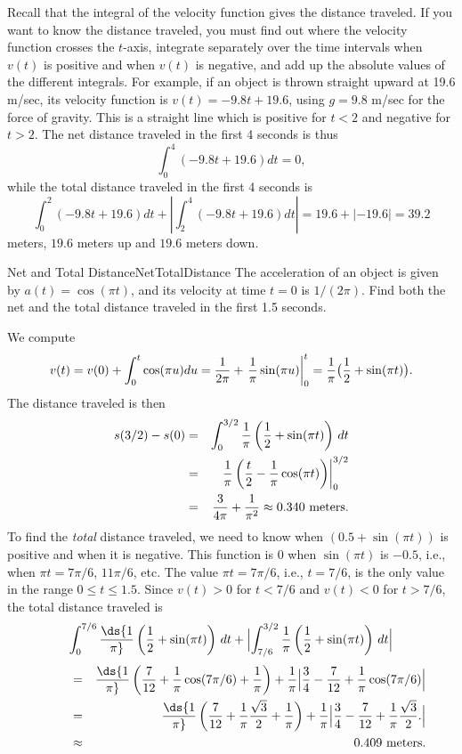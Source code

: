 Recall that the integral of the velocity function gives the  distance
traveled. If you want to know the  distance traveled, 
you must find out where the velocity function
crosses the $t$-axis, integrate separately over the time intervals when
$v(t)$ is positive and when $v(t)$ is negative, and add up the absolute
values of the different integrals.  For example, if an object is thrown
straight upward at 19.6 m/sec, its velocity function is
$v(t)=-9.8t+19.6$, using $g=9.8$ m/sec for the force of gravity.
This is a straight line which is positive for $t<2$ and negative for $t>2$.
The net distance traveled in the first 4 seconds is thus
$$\int_0^4(-9.8t+19.6)dt=0,$$
 while the total distance traveled in the first
4 seconds is
$$
  \int_0^2(-9.8t+19.6)dt+\left|\int_2^4(-9.8t+19.6)dt\right|=19.6+|-19.6|=39.2
$$ 
meters, $19.6$ meters up and $19.6$ meters down.

\begin{example}{Net and Total Distance}{NetTotalDistance}
The acceleration of an object is given by $a(t)=\cos(\pi
t)$, and its velocity at time $t=0$ is $1/(2\pi)$.  Find both the net and the
total distance traveled in the first 1.5 seconds.
\end{example}

\begin{solution} 
We compute 
$$
  v(t)=v(0)+\int_0^t\cos(\pi u)du={1\over 2\pi}+\left.{1\over\pi}
  \sin(\pi u)\right|_0^t={1\over\pi}\bigl({1\over2}+\sin(\pi t)\bigr).
$$
The  distance traveled is then
\begin{eqnarray*}
  s(3/2)-s(0)&=&\int_0^{3/2}{1\over\pi}\left({1\over2}+\sin(\pi t)\right)\,dt\cr
  &=&\left.{1\over\pi}\left({t\over2}-{1\over\pi}\cos(\pi t)\right)
  \right|_0^{3/2}\cr
  &=&{3\over4\pi}+{1\over\pi^2}\approx 0.340 \hbox{ meters.}\cr
\end{eqnarray*}
To find the {\it total} distance traveled, we need to know when
$(0.5+\sin(\pi t))$ is positive and when it is negative.  This
function is 0 when $\sin(\pi t)$ is $-0.5$, i.e., when $\pi t=7\pi/6$,
$11\pi/6$, etc.  The value $\pi t=7\pi/6$, i.e., $t=7/6$, is the only
value in the range $0\le t\le 1.5$.  Since $v(t)>0$ for $t<7/6$ and
$v(t)<0$ for $t>7/6$, the total distance traveled is
$$ \int_0^{7/6}\ds{1\over \pi}\left({1\over2}+\sin(\pi t)\right)\,dt+
  \Bigl|\int_{7/6}^{3/2} 
  {1\over \pi}\left({1\over2}+\sin(\pi t)\right)\,dt\Bigr|
$$
\begin{eqnarray*}
 ~\qquad~&=&\ds{1\over \pi}\left( {7\over 12}+{1\over \pi}\cos(7\pi/6)+{1\over
    \pi}\right)+
  {1\over \pi}\Bigl|{3\over 4}-{7\over 12}
  +{1\over \pi}\cos(7\pi/6)\Bigr|\\
  &=&\ds{1\over \pi}\left( {7\over 12}+{1\over \pi}{\sqrt3\over2}+{1\over
    \pi}\right)+
  {1\over \pi}\Bigl|{3\over 4}-{7\over 12}
  +{1\over \pi}{\sqrt3\over2}.\Bigr|\\
  &\approx& 0.409 \hbox{ meters.}
\end{eqnarray*}
\end{solution}


